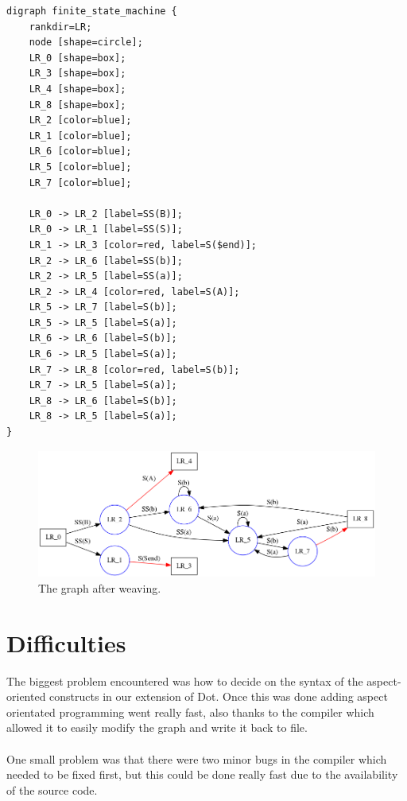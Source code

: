 \documentclass[a4paper]{report}
\begin{document}
\begin{lstlisting}[multicols=2,caption=The woven code.]
digraph finite_state_machine {
	rankdir=LR;
	node [shape=circle];
	LR_0 [shape=box];
	LR_3 [shape=box];
	LR_4 [shape=box];
	LR_8 [shape=box];
	LR_2 [color=blue];
	LR_1 [color=blue];
	LR_6 [color=blue];
	LR_5 [color=blue];
	LR_7 [color=blue];
	
	LR_0 -> LR_2 [label=SS(B)];
	LR_0 -> LR_1 [label=SS(S)];
	LR_1 -> LR_3 [color=red, label=S($end)];
	LR_2 -> LR_6 [label=SS(b)];
	LR_2 -> LR_5 [label=SS(a)];
	LR_2 -> LR_4 [color=red, label=S(A)];
	LR_5 -> LR_7 [label=S(b)];
	LR_5 -> LR_5 [label=S(a)];
	LR_6 -> LR_6 [label=S(b)];
	LR_6 -> LR_5 [label=S(a)];
	LR_7 -> LR_8 [color=red, label=S(b)];
	LR_7 -> LR_5 [label=S(a)];
	LR_8 -> LR_6 [label=S(b)];
	LR_8 -> LR_5 [label=S(a)];
}
\end{lstlisting}
\begin{figure}[h!]
\includegraphics[width=\textwidth]{images/AOFDot/ExampleAfter.png}
\caption{The graph after weaving.}
\end{figure}

\section{Difficulties}
The biggest problem encountered was how to decide on the syntax of the aspect-oriented constructs in our extension of Dot. Once this was done adding aspect orientated programming went really fast, also thanks to the compiler which allowed it to easily modify the graph and write it back to file.\\
\\
One small problem was that there were two minor bugs in the compiler which needed to be fixed first, but this could be done really fast due to the availability of the source code.
\end{document}
